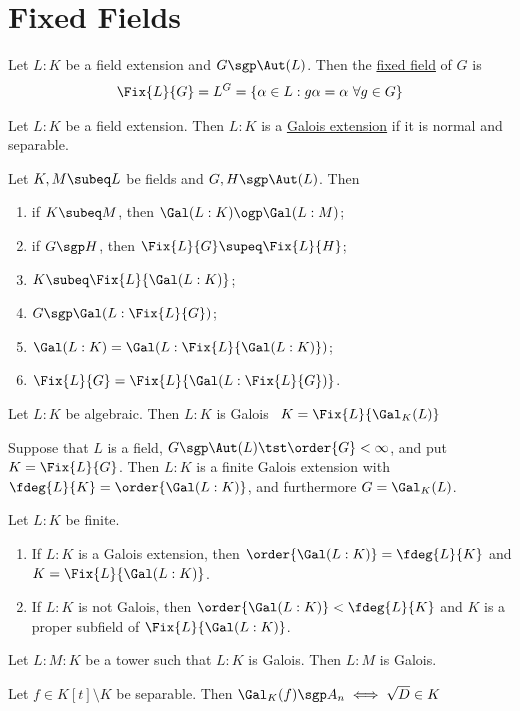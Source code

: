 \documentclass[a4paper]{article}
\begin{document}
\section{Fixed Fields}
\begin{tdefinition}
  Let \( L:K \) be a field extension and \( G\sgp \Aut(L) \). Then the \ul{fixed field} of \( G \) is \begin{align*}
    \Fix{L}{G} = L^G = \{\alpha\in L : g\alpha= \alpha\ \forall g\in G\}
  \end{align*}
\end{tdefinition}

\begin{tdefinition}
  Let \( L:K \) be a field extension.
  Then \( L:K \) is a \ul{Galois extension} if it is normal and separable.
\end{tdefinition}

\begin{tlemma}
  Let \( K,M \subeq L \) be fields and \( G, H \sgp \Aut(L) \).
  Then \begin{enumerate}[label=\arabic*)]
    \item if \( K\subeq M \), then \( \Gal(L:K) \ogp \Gal(L:M) \);
    \item if \( G\sgp H \), then \( \Fix{L}{G} \supeq \Fix{L}{H} \);
    \item \( K\subeq \Fix{L}{\Gal(L:K)} \);
    \item \( G\sgp\Gal(L:\Fix{L}{G}) \);
    \item \( \Gal(L:K) = \Gal(L:\Fix{L}{\Gal(L:K)}) \);
    \item \( \Fix{L}{G} = \Fix{L}{\Gal(L:\Fix{L}{G})} \).
  \end{enumerate}
\end{tlemma}

\begin{ttheorem}
  Let \( L:K \) be algebraic.
  Then \( L:K \) is Galois \iff~\( K=\Fix{L}{\Gal_K(L)} \)
\end{ttheorem}

\begin{ttheorem}
  Suppose that \( L \) is a field, \( G\sgp \Aut(L) \tst \order{G}<\infty\), and put \( K=\Fix{L}{G} \).
  Then \( L:K \) is a finite Galois extension with \( \fdeg{L}{K}=\order{\Gal(L:K)} \), and furthermore \( G=\Gal_K(L) \).
\end{ttheorem}

\begin{ttheorem}
  Let \( L:K \) be finite.
  \begin{enumerate}
    \item If \( L:K \) is a Galois extension, then \( \order{\Gal(L:K)}=\fdeg{L}{K} \) and \( K=\Fix{L}{\Gal(L:K)} \).
    \item If \( L:K \) is not Galois, then \( \order{\Gal(L:K)}<\fdeg{L}{K} \) and \( K \) is a proper subfield of \( \Fix{L}{\Gal(L:K)} \).
  \end{enumerate}
\end{ttheorem}

\begin{tcorollary}
  Let \( L:M:K \) be a tower such that \( L:K \) is Galois.
  Then \( L:M \) is Galois.
\end{tcorollary}

\begin{tproposition}
  Let \( f \in K[t]\setminus K \) be separable.
  Then \( \Gal_K(f)\sgp A_n \iff \sqrt D\in K \)
\end{tproposition}
\end{document}
